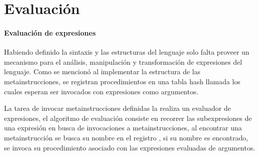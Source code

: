 \documentclass[letterpaper, twoside, openright, 11pt]{book}%
\begin{document}
\section{Evaluación}

\paragraph{Evaluación de expresiones} Habiendo definido la sintaxis y las estructuras del lenguaje solo falta proveer un mecanismo para el análisis, manipulación y transformación de expresiones del lenguaje. Como se mencionó al implementar la estructura de las metainstrucciones, se registran procedimientos en una tabla hash llamada {\Tt{}\nwendquote} los cuales esperan ser invocados con expresiones como argumentos.

La tarea de invocar metainstrucciones definidas la realiza un evaluador de expresiones, el algoritmo de evaluación consiste en recorrer las subexpresiones de una expresión en busca de invocaciones a metainstrucciones, al encontrar una metainstrucción se busca su nombre en el registro {\Tt{}\nwendquote}, si su nombre es encontrado, se invoca su procedimiento asociado con las expresiones evaluadas de argumentos.
\end{document}
